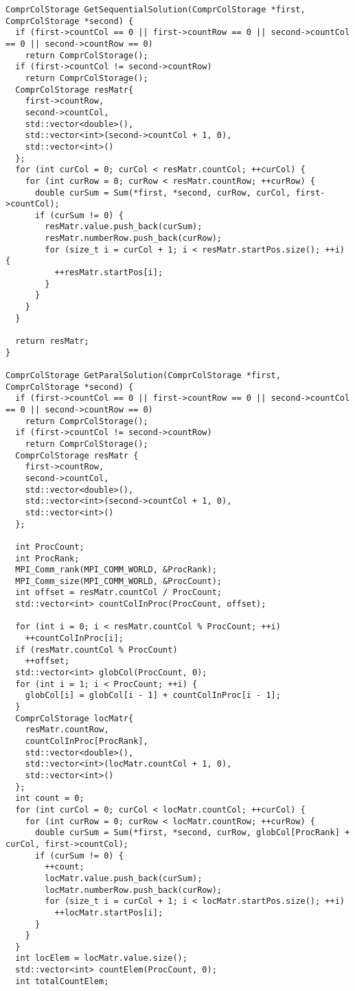 \documentclass{report}
\begin{document}
\begin{lstlisting}
ComprColStorage GetSequentialSolution(ComprColStorage *first, ComprColStorage *second) {
  if (first->countCol == 0 || first->countRow == 0 || second->countCol == 0 || second->countRow == 0)
    return ComprColStorage();
  if (first->countCol != second->countRow)
    return ComprColStorage();
  ComprColStorage resMatr{
    first->countRow,
    second->countCol,
    std::vector<double>(),
    std::vector<int>(second->countCol + 1, 0),
    std::vector<int>()
  };
  for (int curCol = 0; curCol < resMatr.countCol; ++curCol) {
    for (int curRow = 0; curRow < resMatr.countRow; ++curRow) {
      double curSum = Sum(*first, *second, curRow, curCol, first->countCol);
      if (curSum != 0) {
        resMatr.value.push_back(curSum);
        resMatr.numberRow.push_back(curRow);
        for (size_t i = curCol + 1; i < resMatr.startPos.size(); ++i) {
          ++resMatr.startPos[i];
        }
      }
    }
  }

  return resMatr;
}

ComprColStorage GetParalSolution(ComprColStorage *first, ComprColStorage *second) {
  if (first->countCol == 0 || first->countRow == 0 || second->countCol == 0 || second->countRow == 0)
    return ComprColStorage();
  if (first->countCol != second->countRow)
    return ComprColStorage();
  ComprColStorage resMatr {
    first->countRow,
    second->countCol,
    std::vector<double>(),
    std::vector<int>(second->countCol + 1, 0),
    std::vector<int>()
  };

  int ProcCount;
  int ProcRank;
  MPI_Comm_rank(MPI_COMM_WORLD, &ProcRank);
  MPI_Comm_size(MPI_COMM_WORLD, &ProcCount);
  int offset = resMatr.countCol / ProcCount;
  std::vector<int> countColInProc(ProcCount, offset);

  for (int i = 0; i < resMatr.countCol % ProcCount; ++i)
    ++countColInProc[i];
  if (resMatr.countCol % ProcCount)
    ++offset;
  std::vector<int> globCol(ProcCount, 0);
  for (int i = 1; i < ProcCount; ++i) {
    globCol[i] = globCol[i - 1] + countColInProc[i - 1];
  }
  ComprColStorage locMatr{
    resMatr.countRow,
    countColInProc[ProcRank],
    std::vector<double>(),
    std::vector<int>(locMatr.countCol + 1, 0),
    std::vector<int>()
  };
  int count = 0;
  for (int curCol = 0; curCol < locMatr.countCol; ++curCol) {
    for (int curRow = 0; curRow < locMatr.countRow; ++curRow) {
      double curSum = Sum(*first, *second, curRow, globCol[ProcRank] + curCol, first->countCol);
      if (curSum != 0) {
        ++count;
        locMatr.value.push_back(curSum);
        locMatr.numberRow.push_back(curRow);
        for (size_t i = curCol + 1; i < locMatr.startPos.size(); ++i)
          ++locMatr.startPos[i];
      }
    }
  }
  int locElem = locMatr.value.size();
  std::vector<int> countElem(ProcCount, 0);
  int totalCountElem;


\end{lstlisting}
\end{document}
